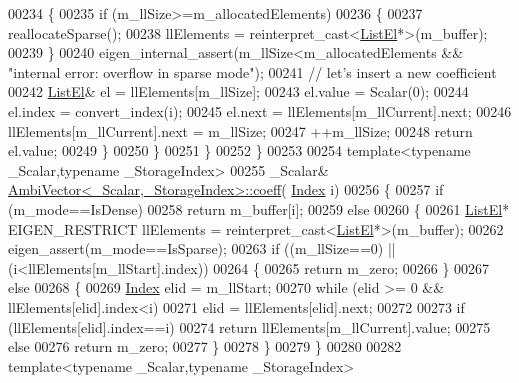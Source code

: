 \begin{DoxyCode}
00234       \{
00235         \textcolor{keywordflow}{if} (m\_llSize>=m\_allocatedElements)
00236         \{
00237           reallocateSparse();
00238           llElements = \textcolor{keyword}{reinterpret\_cast<}\hyperlink{struct_eigen_1_1internal_1_1_ambi_vector_1_1_list_el}{ListEl}*\textcolor{keyword}{>}(m\_buffer);
00239         \}
00240         eigen\_internal\_assert(m\_llSize<m\_allocatedElements && \textcolor{stringliteral}{"internal error: overflow in sparse mode"});
00241         \textcolor{comment}{// let's insert a new coefficient}
00242         \hyperlink{struct_eigen_1_1internal_1_1_ambi_vector_1_1_list_el}{ListEl}& el = llElements[m\_llSize];
00243         el.value = Scalar(0);
00244         el.index = convert\_index(i);
00245         el.next = llElements[m\_llCurrent].next;
00246         llElements[m\_llCurrent].next = m\_llSize;
00247         ++m\_llSize;
00248         \textcolor{keywordflow}{return} el.value;
00249       \}
00250     \}
00251   \}
00252 \}
00253 
00254 \textcolor{keyword}{template}<\textcolor{keyword}{typename} \_Scalar,\textcolor{keyword}{typename} \_StorageIndex>
00255 \_Scalar& \hyperlink{class_eigen_1_1internal_1_1_ambi_vector}{AmbiVector<\_Scalar,\_StorageIndex>::coeff}(
      \hyperlink{namespace_eigen_a62e77e0933482dafde8fe197d9a2cfde}{Index} i)
00256 \{
00257   \textcolor{keywordflow}{if} (m\_mode==IsDense)
00258     \textcolor{keywordflow}{return} m\_buffer[i];
00259   \textcolor{keywordflow}{else}
00260   \{
00261     \hyperlink{struct_eigen_1_1internal_1_1_ambi_vector_1_1_list_el}{ListEl}* EIGEN\_RESTRICT llElements = \textcolor{keyword}{reinterpret\_cast<}\hyperlink{struct_eigen_1_1internal_1_1_ambi_vector_1_1_list_el}{ListEl}*\textcolor{keyword}{>}(m\_buffer);
00262     eigen\_assert(m\_mode==IsSparse);
00263     \textcolor{keywordflow}{if} ((m\_llSize==0) || (i<llElements[m\_llStart].index))
00264     \{
00265       \textcolor{keywordflow}{return} m\_zero;
00266     \}
00267     \textcolor{keywordflow}{else}
00268     \{
00269       \hyperlink{namespace_eigen_a62e77e0933482dafde8fe197d9a2cfde}{Index} elid = m\_llStart;
00270       \textcolor{keywordflow}{while} (elid >= 0 && llElements[elid].index<i)
00271         elid = llElements[elid].next;
00272 
00273       \textcolor{keywordflow}{if} (llElements[elid].index==i)
00274         \textcolor{keywordflow}{return} llElements[m\_llCurrent].value;
00275       \textcolor{keywordflow}{else}
00276         \textcolor{keywordflow}{return} m\_zero;
00277     \}
00278   \}
00279 \}
00280 
00282 \textcolor{keyword}{template}<\textcolor{keyword}{typename} \_Scalar,\textcolor{keyword}{typename} \_StorageIndex>

\end{DoxyCode}

